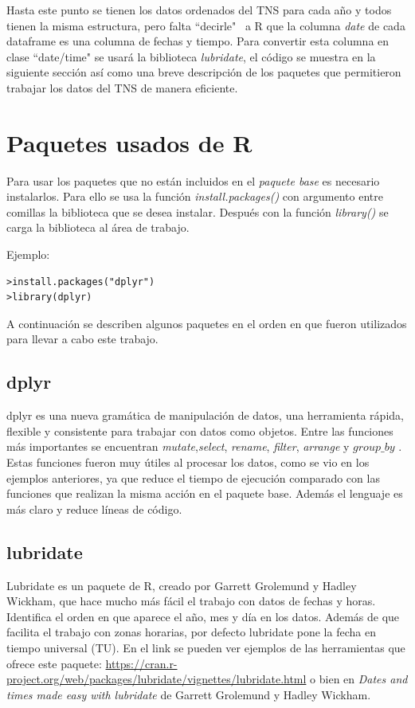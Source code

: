 Hasta este punto se tienen los datos ordenados del TNS para cada año y todos tienen la misma estructura, pero falta ``decirle" \, a R que la columna \emph{date} de cada dataframe es una columna de fechas y tiempo. Para convertir esta columna en clase ``date/time" se usará la biblioteca \emph{lubridate}, el código se muestra en la siguiente sección así como una breve descripción de los paquetes que permitieron trabajar los datos del TNS de manera eficiente.\\

\section{Paquetes usados de R}
Para usar los paquetes que no están incluidos en el \emph{paquete base} es necesario instalarlos. Para ello se usa la función \emph{install.packages()} con argumento entre comillas la biblioteca que se desea instalar. Después con la función \emph{library()} se carga la biblioteca al área de trabajo.

Ejemplo:
\begin{mybox}
\begin{verbatim}
>install.packages("dplyr")
>library(dplyr)
\end{verbatim}
\end{mybox}

A continuación se describen algunos paquetes en el orden en que fueron utilizados para llevar a cabo este trabajo.\\


\subsection{dplyr}
dplyr es una nueva gramática de manipulación de datos, una herramienta rápida, flexible y consistente para trabajar con datos como objetos. Entre las funciones más importantes se encuentran \emph{mutate},\emph{select}, \emph{rename}, \emph{filter}, \emph{arrange} y \emph{$group\_by$} \cite{dply}. Estas funciones fueron muy útiles al procesar los datos, como se vio en los ejemplos anteriores, ya que reduce el tiempo de ejecución comparado con las funciones que realizan la misma acción en el paquete base. Además el lenguaje es más claro y reduce líneas de código.

\subsection{lubridate}

Lubridate es un paquete de R, creado por Garrett Grolemund y Hadley Wickham, que hace mucho más fácil el trabajo con datos de fechas y horas. Identifica el orden en que aparece el año, mes y día en los datos. Además de que facilita el trabajo con zonas horarias, por defecto lubridate pone la fecha en tiempo universal (TU). En el link se pueden ver ejemplos de las herramientas que ofrece este paquete: \url{https://cran.r-project.org/web/packages/lubridate/vignettes/lubridate.html} o bien en \textit{Dates and times made easy with lubridate} de Garrett Grolemund y Hadley Wickham\cite{lubrid}.\\


